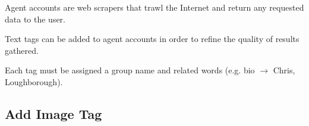 \begin{minipage}{\textwidth}
  \centering
  \begin{minipage}[t]{4.6cm}
    \vspace{0pt}
    \centering
    \begin{minipage}{4.4cm}
      Agent accounts are web scrapers that trawl the Internet and return any requested data to the user.
    \end{minipage}
  \end{minipage}
  \begin{minipage}[t]{4.6cm}
    \vspace{0pt}
    \centering
    \begin{minipage}{4.4cm}
      Text tags can be added to agent accounts in order to refine the quality of results gathered.
    \end{minipage}
  \end{minipage}
  \begin{minipage}[t]{4.6cm}
    \vspace{0pt}
    \centering
    \begin{minipage}{4.4cm}
      Each tag must be assigned a group name and related words (e.g. bio $\rightarrow$ Chris, Loughborough).
    \end{minipage}
  \end{minipage}
\end{minipage}

\clearpage

\subsection{Add Image Tag}


